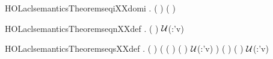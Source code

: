 \newcommand{\HOLaclsemanticsTheoremseqiXXdef}{\UseVerbatim{HOLaclsemanticsTheoremseqiXXdef}}
\begin{SaveVerbatim}{HOLaclsemanticsTheoremseqiXXdomi}
\HOLTokenTurnstile{} \HOLSymConst{\HOLTokenForall{}}  .
         (  ) \HOLSymConst{=}
         (      )
\end{SaveVerbatim}
\newcommand{\HOLaclsemanticsTheoremseqiXXdomi}{\UseVerbatim{HOLaclsemanticsTheoremseqiXXdomi}}
\begin{SaveVerbatim}{HOLaclsemanticsTheoremseqnXXdef}
\HOLTokenTurnstile{} \HOLSymConst{\HOLTokenForall{}}    .
         (  ) \HOLSymConst{=}
       \HOLSymConst{=}   \ensuremath{\cal{U}}(:'v)  \HOLTokenLeftbrace{}\HOLTokenRightbrace{}
\end{SaveVerbatim}
\newcommand{\HOLaclsemanticsTheoremseqnXXdef}{\UseVerbatim{HOLaclsemanticsTheoremseqnXXdef}}
\begin{SaveVerbatim}{HOLaclsemanticsTheoremseqsXXdef}
\HOLTokenTurnstile{} \HOLSymConst{\HOLTokenForall{}}    .
         (  ) \HOLSymConst{=}
     (   (  ) (  )  \ensuremath{\cal{U}}(:'v)
       \HOLTokenLeftbrace{}\HOLTokenRightbrace{}) \HOLConst{\HOLTokenInter{}}
        (  ) (  )  \ensuremath{\cal{U}}(:'v)
      \HOLTokenLeftbrace{}\HOLTokenRightbrace{}
\end{SaveVerbatim}
